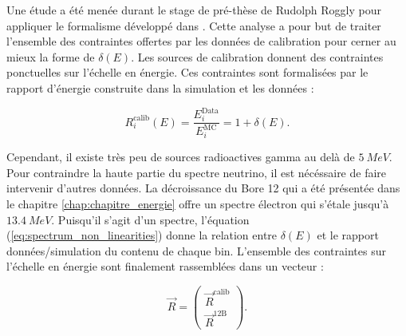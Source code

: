 
Une étude a été menée durant le stage de pré-thèse de Rudolph Roggly pour appliquer le formalisme développé dans \cite{Mention:2017dyq}. Cette analyse a pour but de traiter l'ensemble des contraintes offertes par les données de calibration pour cerner au mieux la forme de $\delta(E)$. Les sources de calibration donnent des contraintes ponctuelles sur l'échelle en énergie. Ces contraintes sont formalisées par le rapport d'énergie construite dans la simulation et les données :

\begin{equation}
    R^\textrm{calib}_i(E) = \frac{E^\textrm{Data}_i }{E^\textrm{MC}_i} = 1 + \delta(E).
\end{equation}

\bigbreak

Cependant, il existe très peu de sources radioactives gamma au delà de $\SI{5}{MeV}$. Pour contraindre la haute partie du spectre neutrino, il est nécéssaire de faire intervenir d'autres données. La décroissance du Bore 12 qui a été présentée dans le chapitre \ref{chap:chapitre_energie} offre un spectre électron qui s'étale jusqu'à $\SI{13.4}{MeV}$. Puisqu'il s'agit d'un spectre, l'équation (\ref{eq:spectrum_non_linearities}) donne la relation entre $\delta(E)$ et le rapport données/simulation du contenu de chaque bin. L'ensemble des contraintes sur l'échelle en énergie sont finalement rassemblées dans un vecteur :

\begin{equation}
    \overrightarrow{R} = \left(\begin{matrix}
        \overrightarrow{R}^\textrm{calib} \\
        \overrightarrow{R}^\textrm{12B}
    \end{matrix} \right).
\end{equation}

